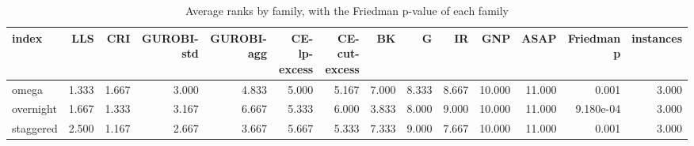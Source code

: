 \begin{table}[htbp]
\centering
\small
\caption{Average ranks by family, with the Friedman p-value of each family}
\label{tab:E6_scalability_b120_ranks_by_family}
\begin{tabular}{lrrrrrrrrrrrrr}
\toprule
index & LLS & CRI & GUROBI-std & GUROBI-agg & CE-lp-excess & CE-cut-excess & BK & G & IR & GNP & ASAP & Friedman p & instances \\
\midrule
omega & 1.333 & 1.667 & 3.000 & 4.833 & 5.000 & 5.167 & 7.000 & 8.333 & 8.667 & 10.000 & 11.000 & 0.001 & 3.000 \\
overnight & 1.667 & 1.333 & 3.167 & 6.667 & 5.333 & 6.000 & 3.833 & 8.000 & 9.000 & 10.000 & 11.000 & 9.180e-04 & 3.000 \\
staggered & 2.500 & 1.167 & 2.667 & 3.667 & 5.667 & 5.333 & 7.333 & 9.000 & 7.667 & 10.000 & 11.000 & 0.001 & 3.000 \\
\bottomrule
\end{tabular}
\end{table}
